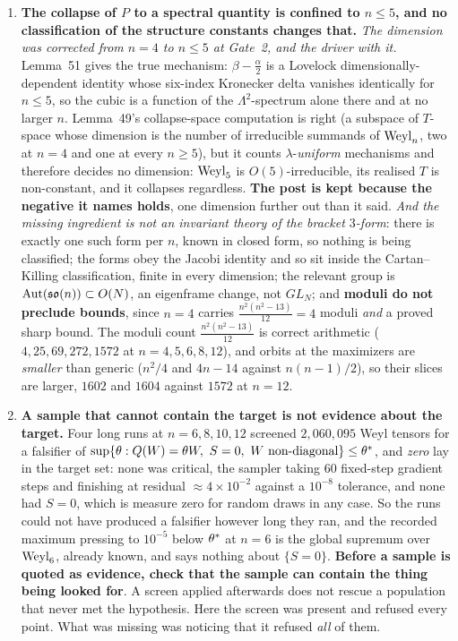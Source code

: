 \begin{enumerate}[leftmargin=1.8em]
\item \textbf{The collapse of $P$ to a spectral quantity is confined to $n\le5$, and no classification of the structure constants changes that.} \emph{The dimension was corrected from $n=4$ to $n\le5$ at Gate~2, and the driver with it.} Lemma~51 gives the true mechanism: $\beta-\tfrac\alpha2$ is a Lovelock dimensionally-dependent identity whose six-index Kronecker delta vanishes identically for $n\le5$, so the cubic is a function of the $\Lambda^2$-spectrum alone there and at no larger $n$. Lemma~49's collapse-space computation is right (a subspace of $T$-space whose dimension is the number of irreducible summands of $\mathrm{Weyl}_n$, two at $n=4$ and one at every $n\ge5$), but it counts $\lambda$-\emph{uniform} mechanisms and therefore decides no dimension: $\mathrm{Weyl}_5$ is $O(5)$-irreducible, its realised $T$ is non-constant, and it collapses regardless. \textbf{The post is kept because the negative it names holds}, one dimension further out than it said. \emph{And the missing ingredient is not an invariant theory of the bracket $3$-form}: there is exactly one such form per $n$, known in closed form, so nothing is being classified; the forms obey the Jacobi identity and so sit inside the Cartan--Killing classification, finite in every dimension; the relevant group is $\mathrm{Aut}(\mathfrak{so}(n))\subset O(N)$, an eigenframe change, not $GL_N$; and \textbf{moduli do not preclude bounds}, since $n=4$ carries $\tfrac{n^2(n^2-13)}{12}=4$ moduli \emph{and} a proved sharp bound. The moduli count $\tfrac{n^2(n^2-13)}{12}$ is correct arithmetic ($4,25,69,272,1572$ at $n=4,5,6,8,12$), and orbits at the maximizers are \emph{smaller} than generic ($n^2/4$ and $4n-14$ against $n(n-1)/2$), so their slices are larger, $1602$ and $1604$ against $1572$ at $n=12$.

\item \textbf{A sample that cannot contain the target is not evidence about the target.} Four long runs at $n=6,8,10,12$ screened $2{,}060{,}095$ Weyl tensors for a falsifier of $\sup\{\theta:Q(W)=\theta W,\ S=0,\ W\text{ non-diagonal}\}\le\theta^{*}$, and \emph{zero} lay in the target set: none was critical, the sampler taking $60$ fixed-step gradient steps and finishing at residual $\approx4\times10^{-2}$ against a $10^{-8}$ tolerance, and none had $S=0$, which is measure zero for random draws in any case. So the runs could not have produced a falsifier however long they ran, and the recorded maximum pressing to $10^{-5}$ below $\theta^{*}$ at $n=6$ is the global supremum over $\mathrm{Weyl}_6$, already known, and says nothing about $\{S=0\}$. \textbf{Before a sample is quoted as evidence, check that the sample can contain the thing being looked for}. A screen applied afterwards does not rescue a population that never met the hypothesis. Here the screen was present and refused every point. What was missing was noticing that it refused \emph{all} of them.


\end{enumerate}

